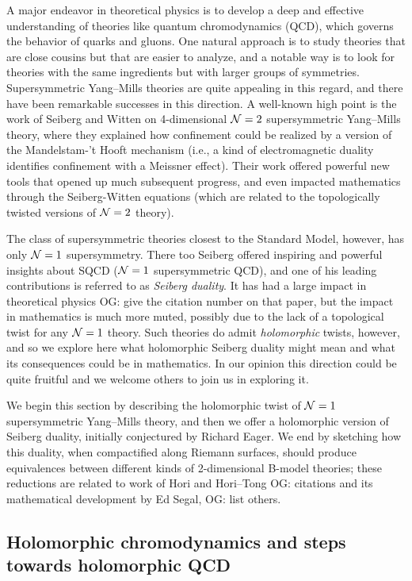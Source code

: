 \documentclass[11pt]{amsart}
\def\owen#1{{\textcolor{violet!50!black}{OG: {#1}}}}
\begin{document}
A major endeavor in theoretical physics is to develop a deep and effective understanding of theories like quantum chromodynamics (QCD), which governs the behavior of quarks and gluons.
One natural approach is to study theories that are close cousins but that are easier to analyze,
and a notable way is to look for theories with the same ingredients but with larger groups of symmetries.
Supersymmetric Yang--Mills theories are quite appealing in this regard,
and there have been remarkable successes in this direction.
A well-known high point is the work of Seiberg and Witten on 4-dimensional $\mathcal N =2$ supersymmetric Yang--Mills theory,
where they explained how confinement could be realized by a version of the Mandelstam-'t Hooft mechanism (i.e., a kind of electromagnetic duality identifies confinement with a Meissner effect).
Their work offered powerful new tools that opened up much subsequent progress,
and even impacted mathematics through the Seiberg-Witten equations (which are related to the topologically twisted versions of $\mathcal N=2$ theory).

The class of supersymmetric theories closest to the Standard Model, however, has only $\mathcal N=1$ supersymmetry.
There too Seiberg offered inspiring and powerful insights about SQCD ($\mathcal N=1$ supersymmetric QCD),
and one of his leading contributions is referred to as {\em Seiberg duality}.
It has had a large impact in theoretical physics \owen{give the citation number on that paper},
but the impact in mathematics is much more muted,
possibly due to the lack of a topological twist for any $\mathcal N=1$ theory.
Such theories do admit {\em holomorphic} twists, however, 
and so we explore here what holomorphic Seiberg duality might mean and what its consequences could be in mathematics.
In our opinion this direction could be quite fruitful and we welcome others to join us in exploring it.

We begin this section by describing the holomorphic twist of $\mathcal N=1$ supersymmetric Yang--Mills theory,
and then we offer a holomorphic version of Seiberg duality, 
initially conjectured by Richard Eager.
We end by sketching how this duality, when compactified along Riemann surfaces,
should produce equivalences between different kinds of 2-dimensional B-model theories;
these reductions are related to work of Hori and Hori--Tong \owen{citations} and its mathematical development by Ed Segal, \owen{list others}.

\subsection{Holomorphic chromodynamics and steps towards holomorphic QCD}
\end{document}
